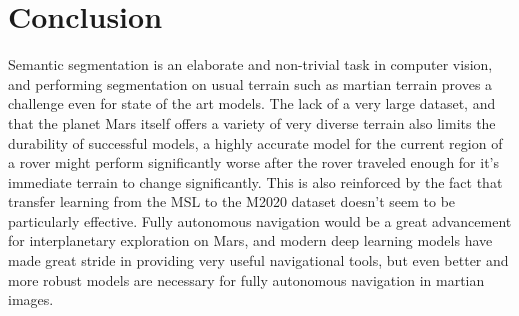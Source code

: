 \documentclass[10pt, conference]{IEEEtran}
\begin{document}
\section{Conclusion}

Semantic segmentation is an elaborate and non-trivial task in computer vision, and performing
segmentation on usual terrain such as martian terrain proves a challenge even for state of the
art models. The lack of a very large dataset, and that the planet Mars itself offers a variety
of very diverse terrain also limits the durability of successful models, a highly accurate model
for the current region of a rover might perform significantly worse after the rover traveled enough
for it's immediate terrain to change significantly. This is also reinforced
by the fact that transfer learning from the MSL to the M2020 dataset doesn't seem to be
particularly effective. Fully autonomous navigation would be a great advancement for interplanetary
exploration on Mars, and modern deep learning models have made great stride in providing very
useful navigational tools, but even better and more robust models are necessary for fully
autonomous navigation in martian images.
 
\end{document}
